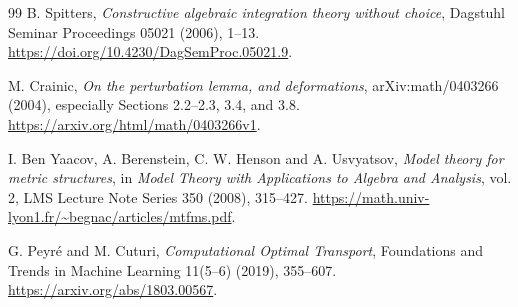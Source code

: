 \begin{thebibliography}{99}
B. Spitters, \emph{Constructive algebraic integration theory without choice},
Dagstuhl Seminar Proceedings 05021 (2006), 1--13.
\url{https://doi.org/10.4230/DagSemProc.05021.9}.

M. Crainic, \emph{On the perturbation lemma, and deformations},
arXiv:math/0403266 (2004), especially Sections 2.2--2.3, 3.4, and 3.8.
\url{https://arxiv.org/html/math/0403266v1}.

I. Ben Yaacov, A. Berenstein, C. W. Henson and A. Usvyatsov,
\emph{Model theory for metric structures}, in \emph{Model Theory with Applications to Algebra and Analysis}, vol. 2, LMS Lecture Note Series 350 (2008), 315--427.
\url{https://math.univ-lyon1.fr/~begnac/articles/mtfms.pdf}.

G. Peyr\'e and M. Cuturi, \emph{Computational Optimal Transport},
Foundations and Trends in Machine Learning 11(5--6) (2019), 355--607.
\url{https://arxiv.org/abs/1803.00567}.


\end{thebibliography}

